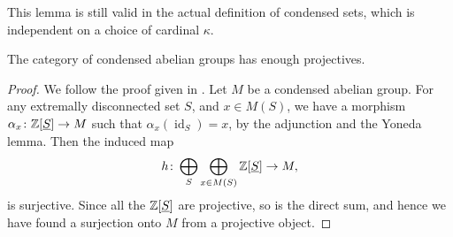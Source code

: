 \documentclass{article}
\DeclareMathOperator{\id}{id}
\begin{document}
This lemma is still valid in the actual definition of condensed sets,
which is independent on a choice of cardinal $\kappa$.
\begin{corollary}
    The category of condensed abelian groups has enough projectives.
\end{corollary}
\begin{proof}
    We follow the proof given in \cite[Theorem 2.2.6]{Dag2021FoundationsCM}.
    Let $M$ be a condensed abelian group. For any extremally
    disconnected set $S$, and $x\in M(S)$, we have a morphism
    $\alpha_x \colon \mathbb{Z}[\underline{S}] \to M$ such that $\alpha_x(\id_{S}) = x$,
    by the adjunction and the Yoneda lemma. Then the induced map
    \begin{equation*}
        h \colon \bigoplus_S \bigoplus_{x\in M(S)}\mathbb{Z}[\underline{S}] \to M,
    \end{equation*}
    is surjective. Since all the $\mathbb{Z}[\underline{S}]$ are projective,
    so is the direct sum, and hence we have found a surjection onto $M$
    from a projective object.
\end{proof}


\nocite{Apa2021condensed}


\end{document}
